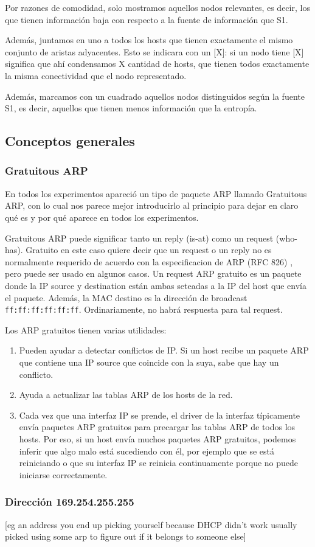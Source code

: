 Por razones de comodidad, solo mostramos aquellos nodos relevantes, es decir, los que tienen información baja con respecto a la fuente de información que S1.

Además, juntamos en uno a todos los hosts que tienen exactamente el mismo conjunto de aristas adyacentes. Esto se indicara con un [X]: si un nodo tiene [X] significa que ahí condensamos X cantidad de hosts, que tienen todos exactamente la misma conectividad que el nodo representado. 

Además, marcamos con un cuadrado aquellos nodos distinguidos según la fuente S1, es decir, aquellos que tienen menos información que la entropía.


\subsection{Conceptos generales}

\subsubsection{Gratuitous ARP}

En todos los experimentos apareció un tipo de paquete ARP llamado Gratuitous ARP, con lo cual nos parece mejor introducirlo al principio para dejar en claro qu\'e es y por qu\'e aparece en todos los experimentos.

Gratuitous ARP puede significar tanto un reply (is-at) como un request (who-has). Gratuito en este caso quiere decir que un request o un reply no es normalmente requerido de acuerdo con la especificacion de ARP (RFC 826) \cite{arp}, pero puede ser usado en algunos casos.
Un request ARP gratuito es un paquete donde la IP source y destination están ambas seteadas a la IP del host que envía el paquete. Además, la MAC destino es la dirección de broadcast \texttt{ff:ff:ff:ff:ff:ff}. Ordinariamente, no habrá respuesta para tal request.

Los ARP gratuitos tienen varias utilidades:

\begin{enumerate}
  \item Pueden ayudar a detectar conflictos de IP. Si un host recibe un paquete ARP que contiene una IP source que coincide con la suya, sabe que hay un conflicto.
  \item Ayuda a actualizar las tablas ARP de los hosts de la red.
  \item Cada vez que una interfaz IP se prende, el driver de la interfaz típicamente envía paquetes ARP gratuitos para precargar las tablas ARP de todos los hosts. Por eso, si un host envía muchos paquetes ARP gratuitos, podemos inferir que algo malo está sucediendo con \'el, por ejemplo que se está reiniciando o que su interfaz IP se reinicia continuamente porque no puede iniciarse correctamente.
\end{enumerate}


\subsubsection{Dirección 169.254.255.255}
[eg an address you end up picking yourself because DHCP didn't work usually picked using some arp to figure out if it belongs to someone else]
